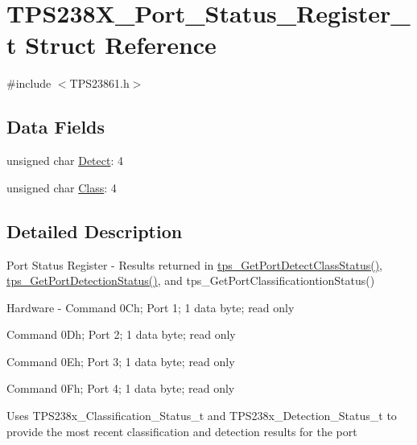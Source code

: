 \hypertarget{struct_t_p_s238_x___port___status___register__t}{\section{T\-P\-S238\-X\-\_\-\-Port\-\_\-\-Status\-\_\-\-Register\-\_\-t Struct Reference}
\label{struct_t_p_s238_x___port___status___register__t}
}


{\ttfamily \#include $<$T\-P\-S23861.\-h$>$}

\subsection*{Data Fields}
\begin{DoxyCompactItemize}
\item 
unsigned char \hyperlink{struct_t_p_s238_x___port___status___register__t_ae5d8a4947a39826f24b8b34ccf1d874f}{Detect}\-: 4
\item 
unsigned char \hyperlink{struct_t_p_s238_x___port___status___register__t_af715401a9c923aa942341d91ae57bc5b}{Class}\-: 4
\end{DoxyCompactItemize}


\subsection{Detailed Description}
Port Status Register -\/ Results returned in \hyperlink{_t_p_s23861_8c_a9c32dd5ccbc70a19734d8123654013bc}{tps\-\_\-\-Get\-Port\-Detect\-Class\-Status()}, \hyperlink{_t_p_s23861_8c_a65536a0909a55f871abfff25444e6458}{tps\-\_\-\-Get\-Port\-Detection\-Status()}, and tps\-\_\-\-Get\-Port\-Classificationtion\-Status() \par
 Hardware -\/ Command 0\-Ch; Port 1; 1 data byte; read only \par

\begin{DoxyItemize}
\item Command 0\-Dh; Port 2; 1 data byte; read only \par

\item Command 0\-Eh; Port 3; 1 data byte; read only \par

\item Command 0\-Fh; Port 4; 1 data byte; read only \par
\par
 Uses T\-P\-S238x\-\_\-\-Classification\-\_\-\-Status\-\_\-t and T\-P\-S238x\-\_\-\-Detection\-\_\-\-Status\-\_\-t to provide the most recent classification and detection results for the port 
\end{DoxyItemize}

